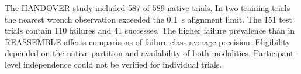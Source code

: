 The HANDOVER study included 587 of 589 native trials. In two training trials the nearest
wrench observation exceeded the 0.1~s alignment limit. The 151 test trials contain 110
failures and 41 successes. The higher failure prevalence than in REASSEMBLE affects
comparisons of failure-class average precision. Eligibility depended on the native
partition and availability of both modalities. Participant-level independence could not
be verified for individual trials.
